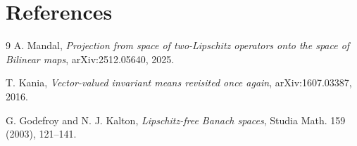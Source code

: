 \documentclass[11pt]{article}
\begin{document}
\section*{References}

\begin{thebibliography}{9}
A. Mandal,
\emph{Projection from space of two-Lipschitz operators onto the space of
Bilinear maps},
arXiv:2512.05640, 2025.

T. Kania,
\emph{Vector-valued invariant means revisited once again},
arXiv:1607.03387, 2016.

G. Godefroy and N. J. Kalton,
\emph{Lipschitz-free Banach spaces},
Studia Math. 159 (2003), 121--141.
\end{thebibliography}
\end{document}
